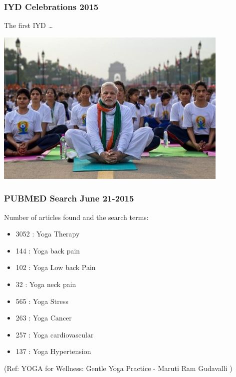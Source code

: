 \begin{frame}[fragile]\frametitle{IYD Celebrations 2015}
The first IYD \ldots

\begin{center}
\includegraphics[width=0.8\linewidth,keepaspectratio]{images/yog17}
\end{center}

\end{frame}


\begin{frame}[fragile]\frametitle{PUBMED Search June 21-2015}

Number of articles found and the search terms: 

	\begin{itemize}
	\item 3052 : Yoga Therapy
	\item 144 : Yoga back pain
	\item 102 : Yoga Low back Pain
	\item 32 : Yoga neck pain
	\item 565 : Yoga Stress
	\item 263 : Yoga Cancer
	\item 257 : Yoga cardiovascular
	\item 137 : Yoga Hypertension
	\end{itemize}

\tiny{(Ref: YOGA for Wellness: Gentle Yoga Practice - Maruti Ram Gudavalli )}


\end{frame}

